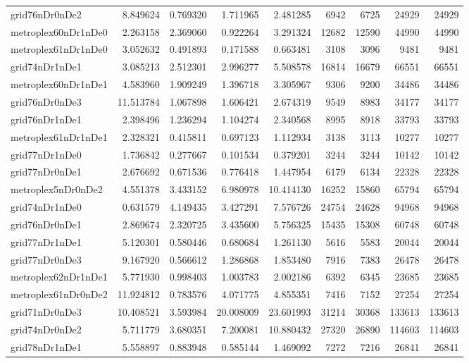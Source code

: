 \begin{longtable}{|l|r|r|r|r|r|r|r|r|}
grid76nDr0nDe2 & 8.849624 & 0.769320 & 1.711965 & 2.481285 & 6942 & 6725 & 24929 & 24929 \\
metroplex60nDr1nDe0 & 2.263158 & 2.369060 & 0.922264 & 3.291324 & 12682 & 12590 & 44990 & 44990 \\
metroplex61nDr1nDe0 & 3.052632 & 0.491893 & 0.171588 & 0.663481 & 3108 & 3096 & 9481 & 9481 \\
grid74nDr1nDe1 & 3.085213 & 2.512301 & 2.996277 & 5.508578 & 16814 & 16679 & 66551 & 66551 \\
metroplex60nDr1nDe1 & 4.583960 & 1.909249 & 1.396718 & 3.305967 & 9306 & 9200 & 34486 & 34486 \\
grid76nDr0nDe3 & 11.513784 & 1.067898 & 1.606421 & 2.674319 & 9549 & 8983 & 34177 & 34177 \\
grid76nDr1nDe1 & 2.398496 & 1.236294 & 1.104274 & 2.340568 & 8995 & 8918 & 33793 & 33793 \\
metroplex61nDr1nDe1 & 2.328321 & 0.415811 & 0.697123 & 1.112934 & 3138 & 3113 & 10277 & 10277 \\
grid77nDr1nDe0 & 1.736842 & 0.277667 & 0.101534 & 0.379201 & 3244 & 3244 & 10142 & 10142 \\
grid77nDr0nDe1 & 2.676692 & 0.671536 & 0.776418 & 1.447954 & 6179 & 6134 & 22328 & 22328 \\
metroplex5nDr0nDe2 & 4.551378 & 3.433152 & 6.980978 & 10.414130 & 16252 & 15860 & 65794 & 65794 \\
grid74nDr1nDe0 & 0.631579 & 4.149435 & 3.427291 & 7.576726 & 24754 & 24628 & 94968 & 94968 \\
grid76nDr0nDe1 & 2.869674 & 2.320725 & 3.435600 & 5.756325 & 15435 & 15308 & 60748 & 60748 \\
grid77nDr1nDe1 & 5.120301 & 0.580446 & 0.680684 & 1.261130 & 5616 & 5583 & 20044 & 20044 \\
grid77nDr0nDe3 & 9.167920 & 0.566612 & 1.286868 & 1.853480 & 7916 & 7383 & 26478 & 26478 \\
metroplex62nDr1nDe1 & 5.771930 & 0.998403 & 1.003783 & 2.002186 & 6392 & 6345 & 23685 & 23685 \\
metroplex61nDr0nDe2 & 11.924812 & 0.783576 & 4.071775 & 4.855351 & 7416 & 7152 & 27254 & 27254 \\
grid71nDr0nDe3 & 10.408521 & 3.593984 & 20.008009 & 23.601993 & 31214 & 30368 & 133613 & 133613 \\
grid74nDr0nDe2 & 5.711779 & 3.680351 & 7.200081 & 10.880432 & 27320 & 26890 & 114603 & 114603 \\
grid78nDr1nDe1 & 5.558897 & 0.883948 & 0.585144 & 1.469092 & 7272 & 7216 & 26841 & 26841 \\

\end{longtable}
